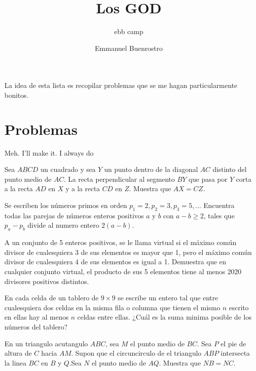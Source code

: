 \documentclass[11pt]{scrartcl}
\title {Los GOD}
\subtitle {ebb camp }
\author{ Emmanuel Buenrostro }
\newcommand{\gad}{\textcolor{yellow}{$\bigstar$}}
\newcommand{\thmdifficulty}{0}
\newcommand{\problemdiff}[1]{\renewcommand{\thmdifficulty}{#1}}
\begin{document}
\maketitle
La idea de esta lista es recopilar problemas que se me hagan particularmente bonitos.

\section{Problemas}

\epigraph{Meh. I'll make it. I always do}{  }


\problemdiff{2}
\begin{problem} 
    Sea $ABCD$ un cuadrado y sea $Y$ un punto dentro de la diagonal $AC$ distinto del punto medio de $AC$. La recta perpendicular al segmento $BY$ que pasa por $Y$ corta a la recta $AD$ en $X$ y a la recta $CD$ en $Z$. Muestra que $AX=CZ$. 
\end{problem}


\problemdiff{3}
\begin{problem}
[OMM 2013/1] 
Se escriben los números primos en orden $p_1=2, p_2=3, p_3=5,\ldots$ Encuentra todas las parejas de números enteros positivos $a$ y $b$ con $a-b\geq 2$, tales que $p_a-p_b$ divide al numero entero $2(a-b)$.
\end{problem}



\begin{problem}
[OMM 2020/1]
A un conjunto de 5 enteros positivos, se le llama virtual si el máximo común divisor de cualesquiera 3 de sus elementos es mayor que 1, pero el máximo común divisor de cualesquiera 4 de sus elementos es igual a 1. Demuestra que en cualquier conjunto virtual, el producto de sus 5 elementos tiene al menos 2020 divisores positivos distintos.
\end{problem}



\problemdiff{4}
\begin{problem}
[ORO 2024/3 \gad]
En cada celda de un tablero de $9\times 9$ se escribe un entero tal que entre cualesquiera dos celdas en la misma fila o columna
que tienen el mismo $n$ escrito en ellas hay al menos $n$ celdas entre ellas. ¿Cu\'al es la suma minima posible de los n\'umeros 
del tablero?
\end{problem}


\problemdiff{4}
\begin{problem}[USAMO 2023/1]
    En un triangulo acutangulo $ABC$, sea $M$ el punto medio de $BC$. Sea $P$ el pie de altura de $C$ hacia $AM$. Supon que el circuncirculo de el triangulo $ABP$ intersecta la linea $BC$ en $B$ y $Q$.Sea $N$ el punto medio de $AQ$. Muestra que $NB=NC$.
\end{problem}
\end{document}
